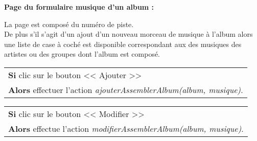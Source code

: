         
            \begin{paragraphe}
                \textbf{Page du formulaire musique d'un album :}
            \end{paragraphe}
            
            \begin{paragraphe}
                La page est composé du numéro de piste. \\
                De plus s'il s'agit d'un ajout d'un nouveau morceau de musique à l'album alors une liste de case à coché est disponible correspondant aux des musiques des artistes ou des groupes dont l'album est composé.
            \end{paragraphe}
            
            \begin{center}
                \begin{tabular}{l}
                    \textbf{Si} clic sur le bouton << Ajouter >> \\
                    \textbf{Alors} effectuer l'action \emph{ajouterAssemblerAlbum(album, musique)}.
                \end{tabular}
            \end{center}
            
            
        \clearpage
            
            \begin{center}
                \begin{tabular}{l}
                    \textbf{Si} clic sur le bouton << Modifier >> \\
                    \textbf{Alors} effectue l'action \emph{modifierAssemblerAlbum(album, musique)}.
                \end{tabular}
            \end{center}
            
        
        
        
        
        
        
        
